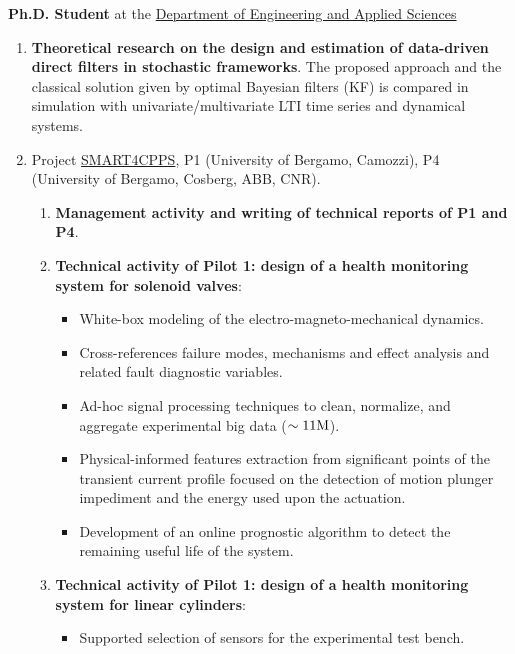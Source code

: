 \documentclass[10pt]{article}
\begin{document}
\par\vspace{6pt}
\begin{minipage}[t]{.80\textwidth}
	\textbf{Ph.D. Student} at the \href{https://disa.unibg.it/}{Department of Engineering and Applied Sciences}
	\begin{enumerate}
		\item \textbf{Theoretical research on the design and estimation of data-driven direct filters in stochastic frameworks}.
		The proposed approach and the classical solution given by optimal Bayesian filters (KF) is compared in simulation with univariate/multivariate LTI time series and dynamical systems.
		\item Project \href{https://www.smart4cpps.it/}{SMART4CPPS}, P1 ({\small University of Bergamo, Camozzi}), P4 ({\small University of Bergamo, Cosberg, ABB, CNR}).
		\begin{enumerate}
			\item \textbf{Management activity and writing of technical reports of P1 and P4}.
			\item \textbf{Technical activity of Pilot 1: design of a health monitoring system for solenoid valves}:
			\begin{itemize}
				\item White-box modeling of the electro-magneto-mechanical dynamics.
				\item Cross-references failure modes, mechanisms and effect analysis and related fault diagnostic variables.
				\item Ad-hoc signal processing techniques to clean, normalize, and aggregate experimental big data ($\sim 11 \textnormal{M}$).
				\item Physical-informed features extraction from significant points of the transient current profile focused on the detection of motion plunger impediment and the energy used upon the actuation.
				\item Development of an online prognostic algorithm to detect the remaining useful life of the system.
			\end{itemize}
			\item \textbf{Technical activity of Pilot 1: design of a health monitoring system for linear cylinders}:
			\begin{itemize}
				\item Supported selection of sensors for the experimental test bench.

\end{itemize}
\end{enumerate}
\end{enumerate}
\end{minipage}
\end{document}
